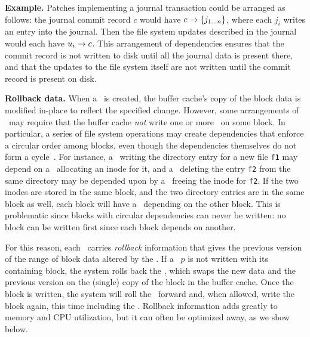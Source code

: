\textbf{Example.}
%
Patches implementing a journal transaction could be arranged as follows:
%
the journal commit record $c$ would have $c \rightarrow \{j_{1\dots n}\}$,
where each $j_i$ writes an entry into the journal.
%
Then the file system updates described in the journal would each have
$u_i \rightarrow c$.
%
This arrangement of dependencies ensures that the commit record is not written
to disk until all the journal data is present there, and that the updates to the
file system itself are not written until the commit record is present on disk.


\textbf{Rollback data.}
%
When a \patch\ is created, the buffer cache's copy of the block data
is modified in-place to reflect the specified change. However,
%
some arrangements of \patches\ may require that the buffer cache
\emph{not} write one or more \patches\ on some block.
%
In particular, a series of file system operations may create dependencies
that enforce a circular order among blocks, even though the dependencies
themselves do not form a cycle~\cite{ganger00soft}.
%
For instance, a \patch\ writing the directory entry for a new file \texttt{f1}
may depend on a \patch\ allocating an inode for it, and a \patch\ deleting the
entry \texttt{f2} from the same directory may be depended upon by a \patch\
freeing the inode for \texttt{f2}.
%
If the two inodes are stored in the same block, and the two directory entries
are in the same block as well, each block will have a \patch\ depending on the
other block.
%
This is problematic since blocks with circular dependencies can never be
written: no block can be written first since each block depends on another.

For this reason, each \patch\ carries \emph{rollback} information that gives
the previous version of the range of block data altered by the \patch.
%
If a \patch\ $p$ is not written with its containing block, the system rolls
back the \patch, which swaps the new data and the previous version on
the (single) copy of the block in the buffer cache.
%
Once the block is written, the system will roll the \patch\ forward and, when
allowed, write the block again, this time including the \patch.
%
Rollback information adds greatly to memory and CPU utilization, but it can
often be optimized away, as we show below.

